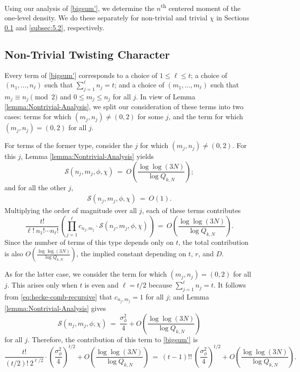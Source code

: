 \documentclass[12pt, reqno,oneside]{amsart}
\theoremstyle{plain}
\theoremstyle{definition}
\theoremstyle{remark}
\theoremstyle{plain}
\numberwithin{equation}{section}
\begin{document}
Using our analysis of \eqref{bigsum'}, we determine the $n$\textsuperscript{th} centered moment of the one-level density. We do these separately for non-trivial and trivial $\chi$ in Sections \ref{subsec:5.1} and \ref{subsec:5.2}, respectively.

%
%

\subsection{Non-Trivial Twisting Character}\label{subsec:5.1}
Every term of \eqref{bigsum'} corresponds to a choice of $1 \leq \ell \leq t$; a choice of $(n_1,\dots,n_{\ell})$ such that $\sum_{j=1}^\ell n_j = t$; and a choice of $(m_1,\dots,m_\ell)$ such that $m_j\equiv n_j\pmod{2}$ and $0 \leq m_j \leq n_j$ for all $j$. In view of Lemma \ref{lemma:Nontrivial-Analysis}, we split our consideration of these terms into two cases: terms for which $(m_j,n_j)\neq(0,2)$ for some $j$, and the term for which $(m_j,n_j)=(0,2)$ for all $j$. 

For terms of the former type, consider the $j$ for which $(m_j,n_j)\neq(0,2)$. For this $j$, Lemma \ref{lemma:Nontrivial-Analysis} yields
\begin{equation}
\mathcal{S}(n_j,m_j,\phi,\chi) \ = \ O\left(\frac{\log\log(3N)}{\log Q_{k,N}}\right);
\end{equation}
and for all the other $j$,
\begin{align}
\mathcal{S}(n_j,m_j,\phi,\chi) \ = \ O(1).
\end{align}
Multiplying the order of magnitude over all $j$, each of these terms contributes
\begin{equation}\label{Nontrivial-Error}
\frac{t!}{\ell! \ n_1!\cdots n_\ell!}\left(\prod_{j=1}^\ell c_{n_j,m_j}\cdot \mathcal{S}(n_j,m_j,\phi,\chi)\right) \ = \ O\left(\frac{\log\log(3N)}{\log Q_{k,N}}\right).
\end{equation}
Since the number of terms of this type depends only on $t$, the total contribution is also $O\left(\frac{\log\log(3N)}{\log Q_{k,N}}\right)$, the implied constant depending on $t$, $r$, and $D$. 

As for the latter case, we consider the term for which $(m_j,n_j)=(0,2)$ for all $j$. This arises only when $t$ is even and $\ell=t/2$ because $\sum_{j=1}^\ell n_j=t$. It follows from \eqref{eq:hecke-comb-recursive} that $c_{n_j,m_j}=1$ for all $j$; and Lemma \ref{lemma:Nontrivial-Analysis} gives 
\begin{equation}
\mathcal{S}(n_j,m_j,\phi,\chi) \ = \ \frac{\sigma_\phi^2}{4}+O\left(\frac{\log\log(3N)}{\log Q_{k,N}}\right)
\end{equation}
for all $j$.
Therefore, the contribution of this term to \eqref{bigsum'} is
\begin{equation}\label{Nontrivial-Main}
\frac{t!}{\left(t/2\right)! \ 2^{\ell/2}}\cdot\left(\frac{\sigma_\phi^2}{4}\right)^{t/2}+O\left(\frac{\log\log(3N)}{\log Q_{k,N}}\right) \ = \ (t-1)!! \ \left(\frac{\sigma_\phi^2}{4}\right)^{t/2}+O\left(\frac{\log\log(3N)}{\log Q_{k,N}}\right).
\end{equation}
\end{document}
